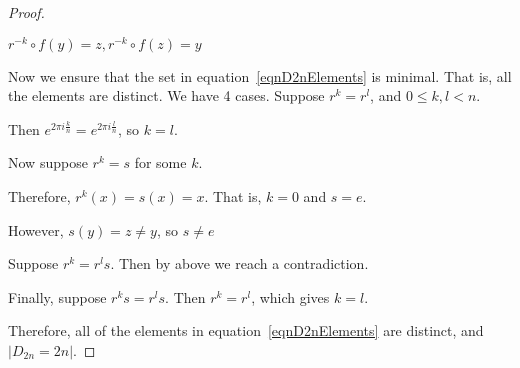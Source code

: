 \documentclass[../Main.tex]{subfiles}
\begin{document}
\begin{proof}
\begin{case}{$r^{-k} \circ f(y) = z, r^{-k} \circ f(z) = y$}
    \end{case}
    Now we ensure that the set in equation~\ref{eqnD2nElements} is minimal. That is, all the elements are distinct. We have 4 cases.
    Suppose $r^k = r^l$, and $0 \leq k, l < n$.\par
    \begin{indentenvironment}
        Then $e^{2 \pi i \frac{k}{n}} = e^{2 \pi i \frac{l}{n}}$, so $k = l$.
    \end{indentenvironment}
    Now suppose $r^k = s$ for some $k$.
    \begin{indentenvironment}
        Therefore, $r^k(x) = s(x) = x$. That is, $k = 0$ and $s = e$.\par
        However, $s(y) = z \neq y$, so $s \neq e$ \contradiction
    \end{indentenvironment}
    Suppose $r^k = r^l s$. Then by above we reach a contradiction.\par
    Finally, suppose $r^k s = r^l s$. Then $r^k = r^l$, which gives $k = l$.\par
    Therefore, all of the elements in equation~\ref{eqnD2nElements} are distinct, and $|D_{2n} = 2n|$.
\end{proof}
\end{document}
